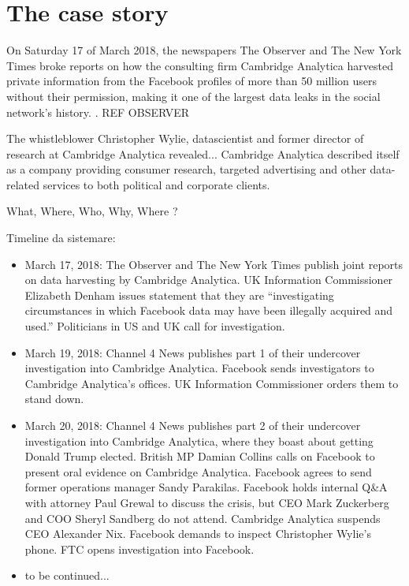 \documentclass[12pt, twoside]{report}
\begin{document}
    
    \tableofcontents
    \chapter{The case story}

On Saturday 17 of March 2018, the newspapers The Observer and The New York Times broke reports on how the consulting firm Cambridge Analytica harvested private information from the Facebook profiles of more than 50 million users without their permission, making it one of the largest data leaks in the social network’s history. \cite{nyt_17march}. REF OBSERVER

The whistleblower Christopher Wylie, datascientist and former director of research at Cambridge Analytica revealed...
Cambridge Analytica described itself as a company providing consumer research, targeted advertising and other data-related services to both political and corporate clients.

What, Where, Who, Why, Where ?


Timeline da sistemare: \cite{nyt_timeline}
\begin{itemize}

\item March 17, 2018: The Observer and The New York Times publish joint reports on data harvesting by Cambridge Analytica. UK Information Commissioner Elizabeth Denham issues statement that they are “investigating circumstances in which Facebook data may have been illegally acquired and used.” Politicians in US and UK call for investigation.

\item March 19, 2018: Channel 4 News publishes part 1 of their undercover investigation into Cambridge Analytica. Facebook sends investigators to Cambridge Analytica’s offices. UK Information Commissioner orders them to stand down.

\item March 20, 2018: Channel 4 News publishes part 2 of their undercover investigation into Cambridge Analytica, where they boast about getting Donald Trump elected. British MP Damian Collins calls on Facebook to present oral evidence on Cambridge Analytica. Facebook agrees to send former operations manager Sandy Parakilas. Facebook holds internal Q\&A with attorney Paul Grewal to discuss the crisis, but CEO Mark Zuckerberg and COO Sheryl Sandberg do not attend. Cambridge Analytica suspends CEO Alexander Nix. Facebook demands to inspect Christopher Wylie’s phone. FTC opens investigation into Facebook.
\item to be continued...
\end{itemize}
\end{document}
